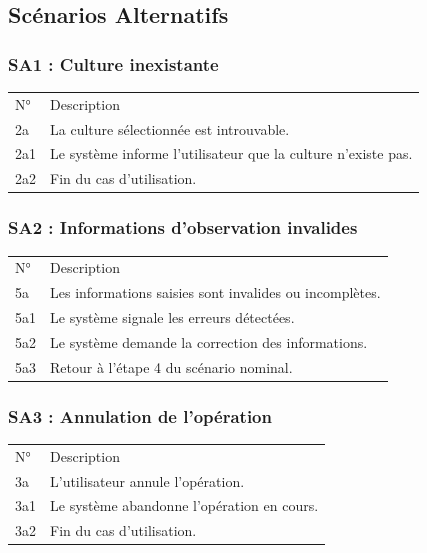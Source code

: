 \documentclass[
]{book}
\begin{document}
\hypertarget{scuxe9narios-alternatifs-2}{%
\subsection{Scénarios Alternatifs}\label{scuxe9narios-alternatifs-2}}

\hypertarget{sa1-culture-inexistante}{%
\subsubsection{SA1 : Culture
inexistante}\label{sa1-culture-inexistante}}

\begin{longtable}[]{@{}ll@{}}
\toprule
\endhead
N° & Description \\
2a & La culture sélectionnée est introuvable. \\
2a1 & Le système informe l'utilisateur que la culture n'existe pas. \\
2a2 & Fin du cas d'utilisation. \\
\bottomrule
\end{longtable}

\hypertarget{sa2-informations-dobservation-invalides}{%
\subsubsection{SA2 : Informations d'observation
invalides}\label{sa2-informations-dobservation-invalides}}

\begin{longtable}[]{@{}ll@{}}
\toprule
\endhead
N° & Description \\
5a & Les informations saisies sont invalides ou incomplètes. \\
5a1 & Le système signale les erreurs détectées. \\
5a2 & Le système demande la correction des informations. \\
5a3 & Retour à l'étape 4 du scénario nominal. \\
\bottomrule
\end{longtable}

\hypertarget{sa3-annulation-de-lopuxe9ration-1}{%
\subsubsection{SA3 : Annulation de
l'opération}\label{sa3-annulation-de-lopuxe9ration-1}}

\begin{longtable}[]{@{}ll@{}}
\toprule
\endhead
N° & Description \\
3a & L'utilisateur annule l'opération. \\
3a1 & Le système abandonne l'opération en cours. \\
3a2 & Fin du cas d'utilisation. \\
\bottomrule
\end{longtable}
\end{document}
